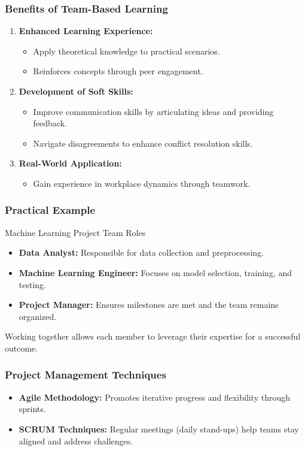 \documentclass[aspectratio=169]{beamer}
\begin{document}
\begin{frame}[fragile]
    \frametitle{Benefits of Team-Based Learning}
    \begin{enumerate}
        \item \textbf{Enhanced Learning Experience:}
            \begin{itemize}
                \item Apply theoretical knowledge to practical scenarios.
                \item Reinforces concepts through peer engagement.
            \end{itemize}
        \item \textbf{Development of Soft Skills:}
            \begin{itemize}
                \item Improve communication skills by articulating ideas and providing feedback.
                \item Navigate disagreements to enhance conflict resolution skills.
            \end{itemize}
        \item \textbf{Real-World Application:}
            \begin{itemize}
                \item Gain experience in workplace dynamics through teamwork.
            \end{itemize}
    \end{enumerate}
\end{frame}

\begin{frame}[fragile]
    \frametitle{Practical Example}
    \begin{block}{Machine Learning Project Team Roles}
        \begin{itemize}
            \item \textbf{Data Analyst:} Responsible for data collection and preprocessing.
            \item \textbf{Machine Learning Engineer:} Focuses on model selection, training, and testing.
            \item \textbf{Project Manager:} Ensures milestones are met and the team remains organized.
        \end{itemize}
        Working together allows each member to leverage their expertise for a successful outcome.
    \end{block}
\end{frame}

\begin{frame}[fragile]
    \frametitle{Project Management Techniques}
    \begin{itemize}
        \item \textbf{Agile Methodology:} Promotes iterative progress and flexibility through sprints.
        \item \textbf{SCRUM Techniques:} Regular meetings (daily stand-ups) help teams stay aligned and address challenges.
    \end{itemize}
\end{frame}
\end{document}
